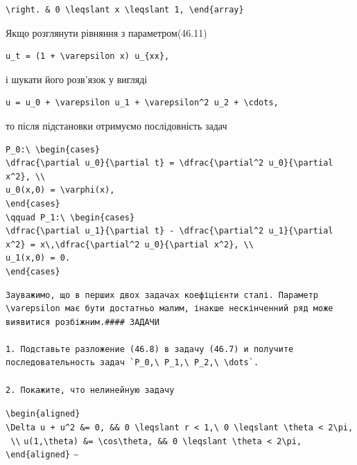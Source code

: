 \documentclass[
  ukrainian,
]{article}
\begin{document}
\begin{verbatim}
\right. & 0 \leqslant x \leqslant 1, \end{array}
\end{verbatim}

Якщо розглянути рівняння з параметром(46.11)

\begin{verbatim}
u_t = (1 + \varepsilon x) u_{xx},
\end{verbatim}

і шукати його розв'язок у вигляді

\begin{verbatim}
u = u_0 + \varepsilon u_1 + \varepsilon^2 u_2 + \cdots,
\end{verbatim}

то після підстановки отримуємо послідовність задач

\begin{verbatim}
P_0:\ \begin{cases}
\dfrac{\partial u_0}{\partial t} = \dfrac{\partial^2 u_0}{\partial x^2}, \\
u_0(x,0) = \varphi(x),
\end{cases}
\qquad P_1:\ \begin{cases}
\dfrac{\partial u_1}{\partial t} - \dfrac{\partial^2 u_1}{\partial x^2} = x\,\dfrac{\partial^2 u_0}{\partial x^2}, \\
u_1(x,0) = 0.
\end{cases}
\end{verbatim}

\begin{verbatim}
Зауважимо, що в перших двох задачах коефіцієнти сталі. Параметр \varepsilon має бути достатньо малим, інакше нескінченний ряд може виявитися розбіжним.#### ЗАДАЧИ

1. Подставьте разложение (46.8) в задачу (46.7) и получите последовательность задач `P_0,\ P_1,\ P_2,\ \dots`.

2. Покажите, что нелинейную задачу
\end{verbatim}

\texttt{\textbackslash{}begin\{aligned\}}
\texttt{\textbackslash{}Delta\ u\ +\ u\^{}2\ \&=\ 0,\ \&\&\ 0\ \textbackslash{}leqslant\ r\ \textless{}\ 1,\textbackslash{}\ 0\ \textbackslash{}leqslant\ \textbackslash{}theta\ \textless{}\ 2\textbackslash{}pi,\ \textbackslash{}\textbackslash{}}
\texttt{u(1,\textbackslash{}theta)\ \&=\ \textbackslash{}cos\textbackslash{}theta,\ \&\&\ 0\ \textbackslash{}leqslant\ \textbackslash{}theta\ \textless{}\ 2\textbackslash{}pi,}
\texttt{\textbackslash{}end\{aligned\}}
\textsubscript{}\textasciitilde{}
\end{document}
